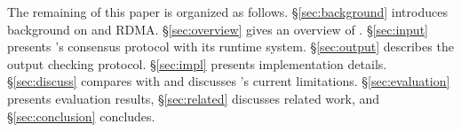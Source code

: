 


The remaining of this paper is organized as follows.
\S\ref{sec:background} introduces background on \paxos and RDMA.
\S\ref{sec:overview} gives an overview of \xxx. \S\ref{sec:input} presents 
\xxx's consensus protocol with its runtime system. \S\ref{sec:output} describes 
the output checking protocol. \S\ref{sec:impl} presents implementation 
details. \S\ref{sec:discuss} compares \dare with \xxx and discusses \xxx's 
current limitations. \S\ref{sec:evaluation} presents evaluation results, 
\S\ref{sec:related} discusses related work, and \S\ref{sec:conclusion} 
concludes. 


